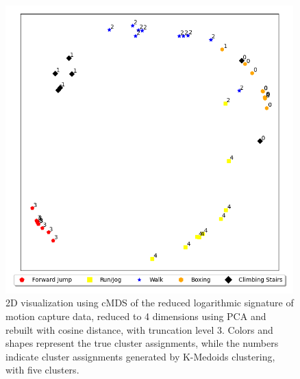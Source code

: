 \begin{figure}
    \centering
    \includegraphics[width=0.99\textwidth]{figures/motion-capture-data/2d_plots/logsig_level3_red}
    \caption[2D cMDS Visualization of PCA-Reduced Logarithmic Signature Motion Capture Data (Truncation Level 3)]{2D visualization using cMDS of the reduced logarithmic signature of motion capture data, reduced to 4 dimensions using PCA and rebuilt with cosine distance, with truncation level 3. Colors and shapes represent the true cluster assignments, while the numbers indicate cluster assignments generated by K-Medoids clustering, with five clusters.}
    \label{fig:2d-logsig-level3_reduced}
\end{figure}
